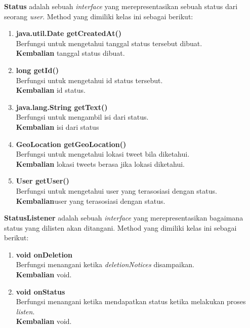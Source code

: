 \textbf{Status} adalah sebuah \textit{interface} yang merepresentasikan sebuah status dari seorang \textit{user}. Method yang dimiliki kelas ini sebagai berikut:
\begin{enumerate}
	\item \textbf{java.util.Date getCreatedAt()}\\
	Berfungsi untuk mengetahui tanggal status tersebut dibuat.\\
	\textbf{Kembalian} tanggal status dibuat.
	\item \textbf{long getId()}\\
	Berfungsi untuk mengetahui id status tersebut.\\
	\textbf{Kembalian} id status.
	\item \textbf{java.lang.String getText()}\\
	Berfungsi untuk mengambil isi dari status.\\
	\textbf{Kembalian} isi dari status
	\item \textbf{GeoLocation getGeoLocation()}\\
	Berfungsi untuk mengetahui lokasi tweet bila diketahui.\\
	\textbf{Kembalian} lokasi tweets berasa jika lokasi diketahui.
	\item \textbf{User getUser()}\\
	Berfungsi untuk mengetahui user yang terasosiasi dengan status.\\
	\textbf{Kembalian}user yang terasosiasi dengan status.
\end{enumerate}
\textbf{StatusListener} adalah sebuah \textit{interface} yang merepresentasikan bagaimana status yang dilisten akan ditangani. Method yang dimiliki kelas ini sebagai berikut:
\begin{enumerate}
	\item \textbf{void onDeletion}\\
	Berfungsi menangani ketika \textit{deletionNotices} disampaikan.\\
	\textbf{Kembalian} void.
	\item \textbf{void onStatus}\\
	Berfungsi menangani ketika mendapatkan status ketika melakukan proses \textit{listen}.\\
	\textbf{Kembalian} void.
\end{enumerate}
